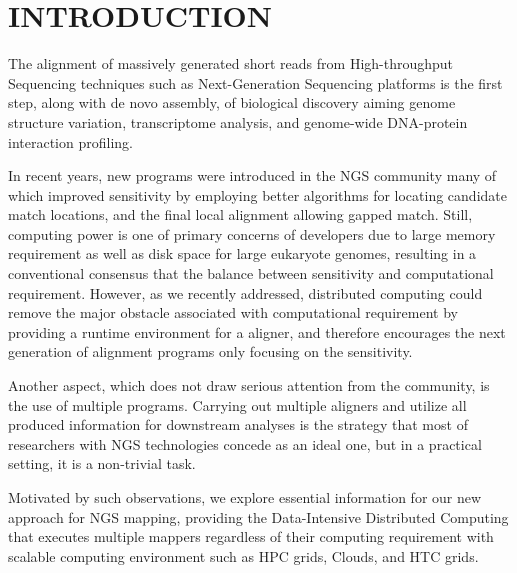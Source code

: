 \documentclass{sig-alternate}
\begin{document}

\section{INTRODUCTION}


The alignment of massively generated short reads from High-throughput Sequencing techniques such as Next-Generation Sequencing platforms is the first step, along with de novo assembly, of biological discovery aiming genome structure variation, transcriptome analysis, and genome-wide DNA-protein interaction profiling.  

In recent years, new programs were introduced in the NGS community many of which improved sensitivity by employing better algorithms for locating candidate match locations, and the final local alignment allowing gapped match.  Still, computing power is one of primary concerns of developers due to large memory requirement as well as disk space for large eukaryote genomes, resulting in a conventional consensus that the balance between sensitivity and computational requirement.  However, as we recently addressed, distributed computing could remove the major obstacle associated with computational requirement by providing a runtime environment for a aligner, and therefore encourages the next generation of alignment programs only focusing on the sensitivity.    

Another aspect, which does not draw serious attention from the community, is the use of multiple programs.  Carrying out multiple aligners and utilize all produced information for downstream analyses is the strategy that most of researchers with NGS technologies concede as an ideal one, but in a practical setting, it is a non-trivial task.      

Motivated by such observations, we explore essential information for our new approach for NGS mapping, providing the Data-Intensive Distributed Computing that executes multiple mappers regardless of their computing requirement with scalable computing environment such as HPC grids, Clouds, and HTC grids.
\end{document}
